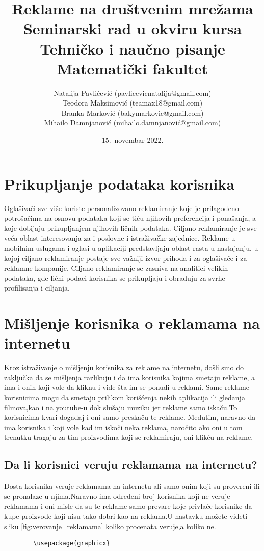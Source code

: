 \documentclass[a4paper]{article}
\title{Reklame na društvenim mrežama\\ \small{Seminarski rad u okviru kursa\\Tehničko i naučno pisanje\\ Matematički fakultet}}
\author{Natalija Pavlićević (pavlicevicnatalija@gmail.com)\\ Teodora Maksimović (teamax18@gmail.com)\\ Branka Marković (bakymarkovic@gmail.com)\\ Mihailo Damnjanović (mihailo.damnjanović@gmail.com)}
\date{15.~novembar 2022.}
\begin{document}
	
	\section{Prikupljanje podataka korisnika}
	\label{sec:podaci}
	Oglašivači sve više koriste personalizovano reklamiranje koje je prilagođeno potrošačima na osnovu podataka koji se tiču njihovih preferencija i ponašanja, a koje dobijaju prikupljanjem njihovih ličnih podataka. Ciljano reklamiranje je sve veća oblast interesovanja za i poslovne i istraživačke zajednice. Reklame u mobilnim uslugama i oglasi u aplikaciji predstavljaju oblast rasta u nastajanju, u kojoj ciljano reklamiranje postaje sve važniji izvor prihoda i za oglašivače i za reklamne kompanije. Ciljano reklamiranje se zasniva na analitici velikih podataka, gde lični podaci korisnika se prikupljaju i obrađuju za svrhe profilisanja i ciljanja.
	

	\section{Mišljenje korisnika o reklamama na internetu}
	\label{sec:misljenje}
	Kroz istraživanje o mišljenju korisnika za reklame na internetu, došli smo do zaključka da se mišljenja razlikuju i da ima korisnika kojima smetaju reklame, a ima i onih koji vole da kliknu i vide šta im se ponudi u reklami.
	Same reklame korisnicima mogu da smetaju prilikom korišćenja nekih aplikacija ili gledanja filmova,kao i na youtube-u dok slušaju muziku jer reklame samo iskaču.To korisnicima kvari događaj i oni samo preskaču te reklame.
	Međutim, naravno da ima korisnika i koji vole kad im iskoči neka reklama, naročito ako oni u tom trenutku tragaju za tim proizvodima koji se reklamiraju, oni klikću na reklame.
	\subsection{Da li korisnici veruju reklamama na internetu?}
	\label{subsec:veovanje_reklamama}
	Dosta korisnika veruje reklamama na internetu ali samo onim koji su provereni ili se pronalaze u njima.Naravno ima određeni broj korisnika koji ne veruje reklamama i oni misle da su te reklame samo prevare koje privlače korisnike da kupe proizvode koji nisu tako dobri kao na reklama.U nastavku možete videti sliku \ref{fig:verovanje_reklamama} koliko procenata veruje,a koliko ne.
	\begin{verbatim}
		\usepackage{graphicx}
	\end{verbatim}
	
\end{document}
